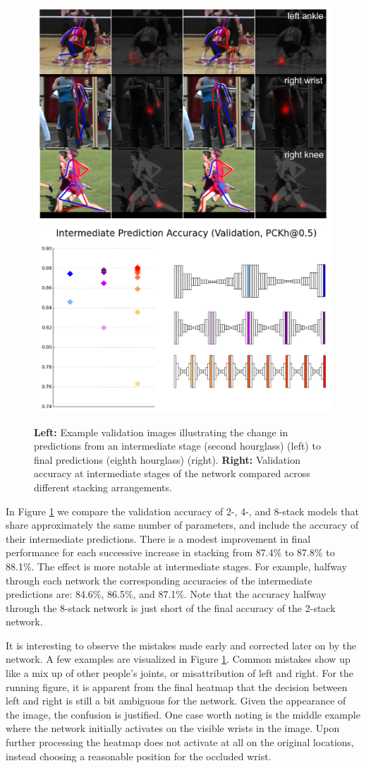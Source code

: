 \documentclass[runningheads]{llncs}
\begin{document}
\begin{figure}[t]
\centering
\includegraphics[width=.45\textwidth]{img/before-after}
\includegraphics[width=.53\textwidth]{img/compare-stack}
\caption{\textbf{Left:} Example validation images illustrating the
  change in predictions from an intermediate stage (second hourglass)
  (left) to final predictions (eighth hourglass)
  (right). \textbf{Right:} Validation accuracy at intermediate stages
  of the network compared across different stacking arrangements.}
\label{fig:inter}
\end{figure}

In Figure \ref{fig:inter} we compare the validation accuracy of 2-,
4-, and 8-stack models that share approximately the same number of
parameters, and include the accuracy of their intermediate
predictions. There is a modest improvement in final performance for
each successive increase in stacking from 87.4\% to 87.8\% to
88.1\%. The effect is more notable at intermediate stages. For
example, halfway through each network the corresponding accuracies of
the intermediate predictions are: 84.6\%, 86.5\%, and 87.1\%. Note
that the accuracy halfway through the 8-stack network is just short of
the final accuracy of the 2-stack network.

It is interesting to observe the mistakes made early and corrected
later on by the network. A few examples are visualized in Figure
\ref{fig:inter}. Common mistakes show up like a mix up of other
people's joints, or misattribution of left and right. For the running
figure, it is apparent from the final heatmap that the decision
between left and right is still a bit ambiguous for the network. Given
the appearance of the image, the confusion is justified. One case
worth noting is the middle example where the network initially
activates on the visible wrists in the image. Upon further processing
the heatmap does not activate at all on the original locations, instead
choosing a reasonable position for the occluded wrist.
\end{document}
